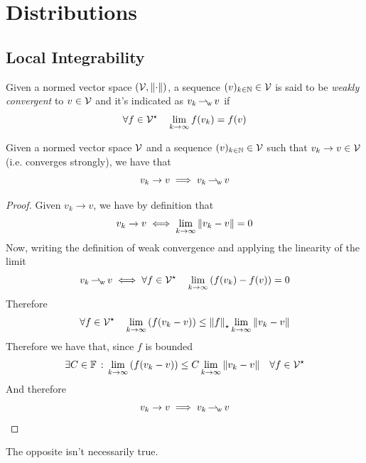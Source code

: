 \documentclass[../complete.tex]{subfiles}
\begin{document}
\section{Distributions}
\subsection{Local Integrability}
\begin{dfn}
	Given a normed vector space $(\mathcal{V},\norm{\cdot})$, a sequence $(v)_{k\in\mathbb{N}}\in\mathcal{V}$ is said to be \textit{weakly convergent} to $v\in\mathcal{V}$ and it's indicated as $v_k\operatorname{\rightharpoonup_{\! w}} v$ if
	\begin{equation*}
		\forall f\in\mathcal{V}^\star\quad\lim_{k\to\infty}f(v_k)=f(v)
	\end{equation*}
\end{dfn}
\begin{thm}
	Given a normed vector space $\mathcal{V}$ and a sequence $(v)_{k\in\mathbb{N}}\in\mathcal{V}$ such that $v_k\to v\in\mathcal{V}$ (i.e. converges strongly), we have that
	\begin{equation*}
		v_k\to v\implies{} v_k\operatorname{\rightharpoonup_{\! w}} v
	\end{equation*}
\end{thm}
\begin{proof}
	Given $v_k\to v$, we have by definition that
	\begin{equation*}
		v_k\to v\iff\lim_{k\to\infty}\norm{v_k-v}=0
	\end{equation*}
	Now, writing the definition of weak convergence and applying the linearity of the limit
	\begin{equation*}
		v_k\operatorname{\rightharpoonup_{\! w}} v\iff\forall f\in\mathcal{V}^\star\quad\lim_{k\to\infty}\left( f(v_k)-f(v) \right)=0
	\end{equation*}
	Therefore
	\begin{equation*}
		\forall f\in\mathcal{V}^\star\quad\lim_{k\to\infty}\left( f(v_k-v) \right)\le\norm{f}_{\star}\lim_{k\to\infty}\norm{v_k-v}
	\end{equation*}
	Therefore we have that, since $f$ is bounded
	\begin{equation*}
		\exists C\in\mathbb{F}\, :\, \lim_{k\to\infty}\left( f(v_k-v) \right)\le C\lim_{k\to\infty}\norm{v_k-v}\quad\forall f\in\mathcal{V}^\star
	\end{equation*}
	And therefore
	\begin{equation*}
		v_k\to v\implies{} v_k\operatorname{\rightharpoonup_{\! w}} v
	\end{equation*}
\end{proof}
\begin{rmk}
	The opposite isn't necessarily true.
\end{rmk}
\end{document}
